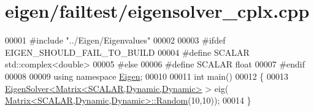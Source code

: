 \hypertarget{eigen_2failtest_2eigensolver__cplx_8cpp_source}{}\section{eigen/failtest/eigensolver\+\_\+cplx.cpp}
\label{eigen_2failtest_2eigensolver__cplx_8cpp_source}

\begin{DoxyCode}
00001 \textcolor{preprocessor}{#include "../Eigen/Eigenvalues"}
00002 
00003 \textcolor{preprocessor}{#ifdef EIGEN\_SHOULD\_FAIL\_TO\_BUILD}
00004 \textcolor{preprocessor}{#define SCALAR std::complex<double>}
00005 \textcolor{preprocessor}{#else}
00006 \textcolor{preprocessor}{#define SCALAR float}
00007 \textcolor{preprocessor}{#endif}
00008 
00009 \textcolor{keyword}{using namespace }\hyperlink{namespace_eigen}{Eigen};
00010 
00011 \textcolor{keywordtype}{int} main()
00012 \{
00013   \hyperlink{group___eigenvalues___module_class_eigen_1_1_eigen_solver}{EigenSolver<Matrix<SCALAR,Dynamic,Dynamic>} > eig(
      \hyperlink{group___core___module_class_eigen_1_1_matrix}{Matrix<SCALAR,Dynamic,Dynamic>::Random}(10,10));
00014 \}
\end{DoxyCode}

